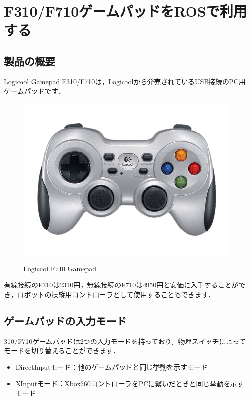 \documentclass[{../../master}]{subfiles}
\begin{document}
\section{F310/F710ゲームパッドをROSで利用する}
\label{sec:f310_f710_gamepad}

\subsection{製品の概要}

  Logicool Gamepad F310/F710は，Logicoolから発売されているUSB接続のPC用ゲームパッドです．

  \begin{figure}[ht]
    \centering
    \includegraphics[width=65truemm, clip]{images/f710_overview.png}
    \label{fig:f710_overview}
    \caption{Logicool F710 Gamepad}
  \end{figure}

  有線接続のF310は2310円，無線接続のF710は4950円と安価に入手することができ，ロボットの操縦用コントローラとして使用することもできます．

\subsection{ゲームパッドの入力モード}

  310/F710ゲームパッドは2つの入力モードを持っており，物理スイッチによってモードを切り替えることができます．

  \begin{itemize}
    \item \textsf{DirectInput}モード：他のゲームパッドと同じ挙動を示すモード
    \item \textsf{XInput}モード：Xbox360コントローラをPCに繋いだときと同じ挙動を示すモード
  \end{itemize}
\end{document}
